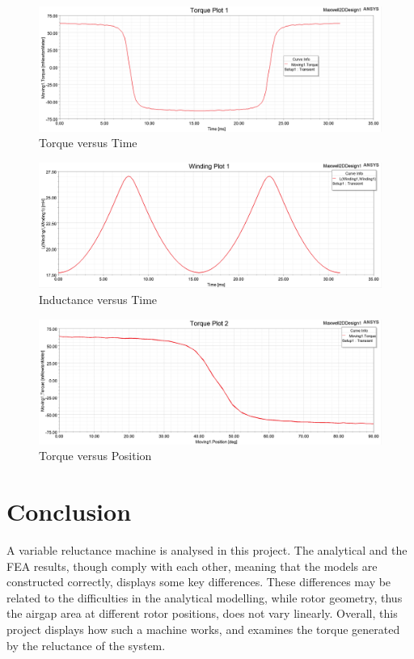 \documentclass[a4paper, 11pt]{article}
\begin{document}
\begin{figure}[h!]
\centering
\includegraphics[width=1\textwidth]{Q5-T.png}
\caption{Torque versus Time}
\end{figure}
\begin{figure}[h!]
\centering
\includegraphics[width=1\textwidth]{Q5-L.png}
\caption{Inductance versus Time}
\end{figure}
\begin{figure}[h!]
\centering
\includegraphics[width=1\textwidth]{Q5-TP.png}
\caption{Torque versus Position}
\end{figure}
\section{Conclusion}
A variable reluctance machine is analysed in this project. The analytical and the FEA results, though comply with each other, meaning that the models are constructed correctly, displays some key differences. These differences may be related to the difficulties in the analytical modelling, while rotor geometry, thus the airgap area at different rotor positions, does not vary linearly.
Overall, this project displays how such a machine works, and examines the torque generated by the reluctance of the system.
\end{document}
